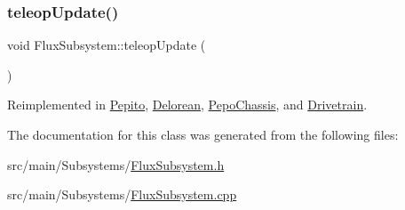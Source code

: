 \mbox{\label{classFluxSubsystem_a327d76affc60699bfa62563e364e42f5}} 
\subsubsection{\texorpdfstring{teleop\+Update()}{teleopUpdate()}}
{\footnotesize\ttfamily void Flux\+Subsystem\+::teleop\+Update (\begin{DoxyParamCaption}{ }\end{DoxyParamCaption})\hspace{0.3cm}{\ttfamily [virtual]}}



Reimplemented in \hyperlink{classPepito_ac19e921b35d2d76cb5b6a2105b26f568}{Pepito}, \hyperlink{classDelorean_a6053dfc106d71fcffa30bac0f5e9b5b8}{Delorean}, \hyperlink{classPepoChassis_af863b7df039af7051b08c051f744e429}{Pepo\+Chassis}, and \hyperlink{classDrivetrain_a3b6bdf96a9388285c7560b2fedfc7ca1}{Drivetrain}.



The documentation for this class was generated from the following files\+:\begin{DoxyCompactItemize}
\item 
src/main/\+Subsystems/\hyperlink{FluxSubsystem_8h}{Flux\+Subsystem.\+h}\item 
src/main/\+Subsystems/\hyperlink{FluxSubsystem_8cpp}{Flux\+Subsystem.\+cpp}\end{DoxyCompactItemize}
